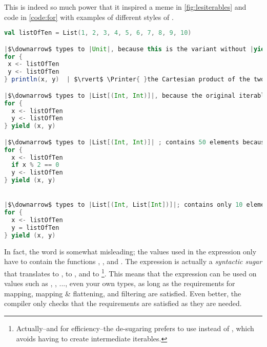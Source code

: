 \documentclass[10 pt]{article}
\begin{document}
This is indeed so much power that it inspired a meme in \autoref{fig:lesiterables} and code in \autoref{code:for} with examples of different styles of .


\begin{lstlisting}[caption={Various for expessions}, label={code:for}, language=Scala, escapechar=|]
val listOfTen = List(1, 2, 3, 4, 5, 6, 7, 8, 9, 10)

|$\downarrow$ types to |Unit|, because this is the variant without |yield body|.|
for {
 x <- listOfTen
 y <- listOfTen
} println(x, y)  | $\rvert$ \Printer{ }the Cartesian product of the two lists: |(1, 1), (1, 2), ..., (1, 10), ..., (10, 9), (10, 10)

|$\downarrow$ types to |List[(Int, Int)]|, because the original iterable was |List|, and the |yield body| evaluates to type |(Int, Int)|; contains 100 elements.|
for {
  x <- listOfTen
  y <- listOfTen
} yield (x, y)

|$\downarrow$ types to |List[(Int, Int)]| ; contains 50 elements because of the |if| filter.|
for {
  x <- listOfTen
  if x % 2 == 0
  y <- listOfTen
} yield (x, y)


|$\downarrow$ types to |List[(Int, List[Int])]|; contains only 10 elements.|
for {
  x <- listOfTen
  y = listOfTen
} yield (x, y)
\end{lstlisting}

In fact, the word  is somewhat misleading; the values used in the  expression only have to contain the functions , , and . The  expression is actually a \emph{syntactic sugar} that translates \pcode{<-} to , \pcode{=} to , and  to \footnote{Actually--and for efficiency--the de-sugaring prefers to use  instead of , which avoids having to create intermediate iterables.}. This means that the  expression can be used on values such as , , ..., even your own types, as long as the requirements for mapping, mapping \& flattening, and filtering are satisfied. Even better, the compiler only checks that the requirements are satisfied as they are needed. 
\end{document}
